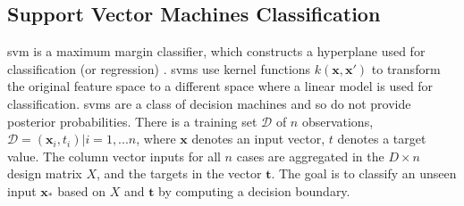 \documentclass[12pt, runningheads,a4paper]{llncs}
\begin{document}


\subsection{Support Vector Machines Classification}

\ac{svm} is a maximum margin classifier, which constructs a hyperplane used for classification (or regression) \cite{Bishop:2006:PRM:1162264}. \acp{svm} use kernel functions $k(\mathbf{x},\mathbf{x'})$ to transform the original feature space to a different space where a linear model is used for classification. \acp{svm} are a class of decision machines and so do not provide posterior probabilities. There is a training set $\mathcal{D}$ of $n$ observations, $\mathcal{D}={(\mathbf{x}_i,t_{i}) | i = 1, ... n} $, where $\mathbf{x}$ denotes an input vector, $t$ denotes a target value. The column vector inputs for all $n$ cases are aggregated in the $D \times n$ design matrix $X$, and the targets in the vector $\mathbf{t}$. The goal is to classify an unseen input $\mathbf{x_{*}}$ based on $X$ and $\mathbf{t}$ by computing a decision boundary. 


\end{document}
